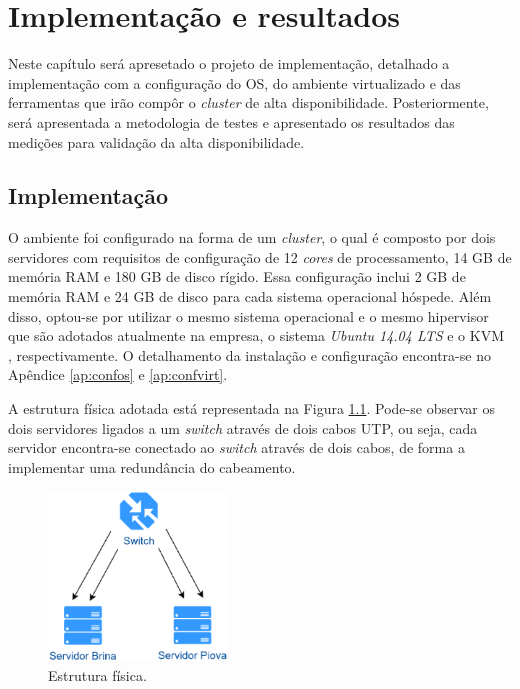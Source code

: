 \chapter{Implementação e resultados}
\label{cap:implementacaoresultados}

Neste capítulo será apresetado o projeto de implementação, detalhado a implementação com a configuração do \ac{OS}, do ambiente virtualizado e 
das ferramentas que irão compôr o \textit{cluster} de alta disponibilidade. Posteriormente, será apresentada a metodologia de testes e 
apresentado os resultados das medições para validação da alta disponibilidade.

\section{Implementação}
\label{section:implementacao}

O ambiente foi configurado na forma de um \textit{cluster}, o qual é composto por dois servidores com requisitos de configuração 
de 12 \textit{cores} de processamento, 14 GB de memória \ac{RAM} e 180 GB de disco rígido.
Essa configuração inclui 2 GB de memória \ac{RAM} e 24 GB de disco para cada sistema operacional hóspede. Além disso, optou-se por utilizar o 
mesmo sistema operacional e o mesmo hipervisor que são adotados atualmente na empresa, o sistema \textit{Ubuntu 14.04 \ac{LTS}} e o \ac{KVM} 
\cite{kvm}, respectivamente. O detalhamento da instalação e configuração encontra-se no Apêndice \ref{ap:confos} e \ref{ap:confvirt}.

A estrutura física adotada está representada na Figura \ref{fig:projeto_fisico}. Pode-se observar os dois servidores ligados a um 
\textit{switch} através de dois cabos UTP, ou seja, cada servidor encontra-se conectado ao \textit{switch} através de dois cabos, de forma a 
implementar uma redundância do cabeamento.

\begin{figure}[h!]
 \centering
 \includegraphics[width=180px]{img/projeto_fisico.eps}
 \caption{Estrutura física.}
 \label{fig:projeto_fisico}
\end{figure}

